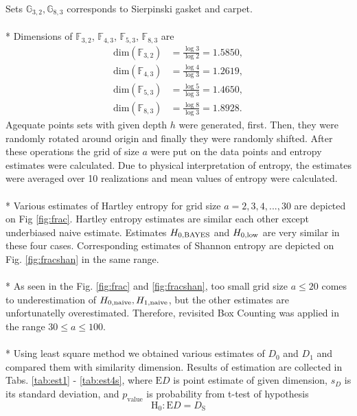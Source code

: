 Sets $\mathbb{G}_{3,2}, \mathbb{G}_{8,3}$ corresponds to Sierpinski gasket and carpet. \\
\\*
Dimensions of $\mathbb{F}_{3,2}$, $\mathbb{F}_{4,3}$, $\mathbb{F}_{5,3}$, $\mathbb{F}_{8,3}$ are
\begin{equation} 
\label{eq:fracdim}
\begin{split}
\text{dim}(\mathbb{F}_{3,2}) & = \frac{\log{3}}{\log{2}} = 1.5850, \\
\text{dim}(\mathbb{F}_{4,3}) & = \frac{\log{4}}{\log{3}} = 1.2619, \\
\text{dim}(\mathbb{F}_{5,3}) & = \frac{\log{5}}{\log{3}} = 1.4650, \\
\text{dim}(\mathbb{F}_{8,3}) & = \frac{\log{8}}{\log{3}} = 1.8928.
\end{split}
\end{equation}
Agequate points sets with given depth $h$ were generated, first. Then, they were randomly rotated around origin and finally they were randomly shifted. After these operations the grid of size $a$ were put on the data points and entropy estimates were calculated. Due to physical interpretation of entropy, the estimates were averaged over 10 realizations and mean values of entropy were calculated. \\
\\*
Various estimates of Hartley entropy for grid size $a=2,3,4,...,30$ are depicted on Fig \ref{fig:frac}. Hartley entropy estimates are similar each other except underbiased naive estimate. Estimates $H_{0,\mbox{\scriptsize{BAYES}}}$ and $H_{0,\mbox{\scriptsize{low}}}$ are very similar in these four cases. Corresponding estimates of Shannon entropy are depicted on Fig. \ref{fig:fracshan} in the same range. \\
\\*
As seen in the Fig. \ref{fig:frac} and \ref{fig:fracshan}, too small grid size $a \leq 20$ comes to underestimation of $H_{0,\mbox{\scriptsize{naive}}}, H_{1,\mbox{\scriptsize{naive}}}$, but the other estimates are unfortunatelly overestimated. Therefore, revisited Box Counting was applied in the range $30 \leq a \leq 100$.\\
\\*
Using least square method we obtained various estimates of $D_{0}$ and $D_{1}$ and compared them with similarity dimension. Results of estimation are collected in Tabs. \ref{tab:est1} - \ref{tab:est4s}, where $\text{E}D$ is point estimate of given dimension, $s_{D}$ is its standard deviation, and $p_{\text{value}}$ is probability from t-test of hypothesis
\begin{equation} 
\label{eq:hypo}
\text{H}_{0} : \text{E}D = D_{\text{S}}
\end{equation}